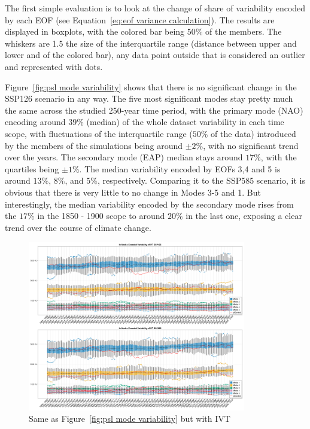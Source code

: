The first simple evaluation is to look at the change of share of variability encoded by each EOF (see Equation~\ref{eq:eof variance calculation}). 
The results are displayed in boxplots, with the colored bar being $50\%$  of the members. 
The whiskers are 1.5 the size of the interquartile range (distance between upper and lower and of the colored bar), any data point outside that is considered an outlier and represented with dots. 


Figure~\ref{fig:psl mode variability} shows that there is no significant change in the SSP126 scenario in any way. 
The five most significant modes stay pretty much the same across the studied 250-year time period, with the primary mode (NAO) encoding around $39\%$ (median) of the whole dataset variability in each time scope, with fluctuations of the interquartile range ($50\%$ of the data) introduced by the members of the simulations being around $\pm 2\%$, with no significant trend over the years. 
The secondary mode (EAP) median stays around $17\%$, with the quartiles being $\pm 1\%$. 
The median variability encoded by EOFs 3,4 and 5 is around $13\%$, $8\%$, and $5\%$, respectively. 
Comparing it to the SSP585 scenario, it is obvious that there is very little to no change in Modes 3-5 and 1. 
But interestingly, the median variability encoded by the secondary mode rises from the $17\%$ in the 1850 - 1900 scope to around $20\%$ in the last one, exposing a clear trend over the course of climate change.   


\begin{figure}[hbt]
  \begin{center}
    \includegraphics[width=0.85\textwidth]{figures/mode_variability_ivt_50seasons.png}
  \end{center}
  \caption{Same as Figure~\ref{fig:psl mode variability} but with IVT}\label{fig:ivt mode variability}
\end{figure}

